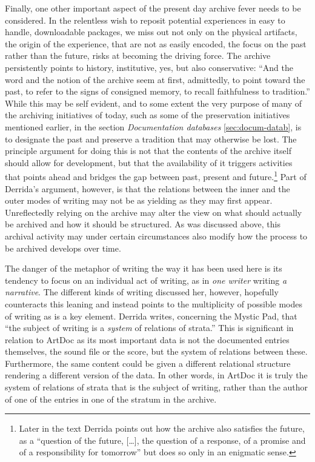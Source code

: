 \documentclass[11pt,a4paper]{article}
\begin{document}
Finally, one other important aspect of the present day archive fever needs to be considered. In the relentless wish to reposit potential experiences in easy to handle, downloadable packages, we miss out not only on the physical artifacts, the origin of the experience, that are not as easily encoded, the focus on the past rather than the future, risks at becoming the driving force. The archive persistently points to history, institutive, yes, but also conservative: ``And the word and the notion of the archive seem at first, admittedly, to point toward the past, to refer to the signs of consigned memory, to recall faithfulness to tradition.'' \citep[p. 33]{derrida1998} While this may be self evident, and to some extent the very purpose of many of the archiving initiatives of today, such as some of the preservation initiatives mentioned earlier, in the section \emph{Documentation databases} \ref{sec:docum-datab}, is to designate the past and preserve a tradition that may otherwise be lost. The principle argument for doing this is not that the contents of the archive itself should  allow for development, but that the availability of it triggers activities that points ahead and bridges the gap between past, present and future.\footnote{Later in the text Derrida points out how the archive also satisfies the future, as a ``question of the future, [\ldots], the question of a response, of a promise and of a responsibility for tomorrow'' \citep[p. 36]{der78} but does so only in an enigmatic sense.} Part of Derrida's argument, however, is that the relations between the inner and the outer modes of writing may not be as yielding as they may first appear. Unreflectedly relying on the archive may alter the view on what should actually be archived and how it should be structured. As was discussed above, this archival activity may under certain circumstances also modify how the process to be archived develops over time. 

The danger of the metaphor of writing the way it has been used here is its tendency to focus on an individual act of writing, as in \emph{one writer} writing \emph{a narrative}. The different kinds of writing discussed her, however, hopefully counteracts this leaning and instead points to the multiplicity of possible modes of writing as is a key element. Derrida writes, concerning the Mystic Pad, that ``the subject of writing is a \emph{system} of relations of strata.'' \citep[p. 285]{der78} This is significant in relation to ArtDoc as its most important data is not the documented entries themselves, the sound file or the score, but the system of relations between these. Furthermore, the same content could be given a different relational structure rendering a different version of the data. In other words, in ArtDoc it is truly the system of relations of strata that is the subject of writing, rather than the author of one of the entries in one of the stratum in the archive.
\end{document}
